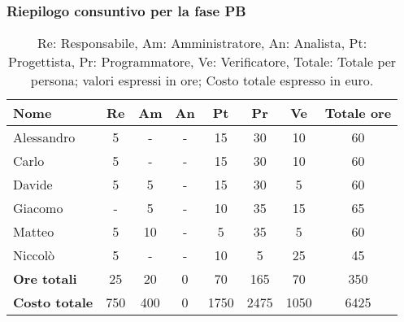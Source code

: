\subsubsection{Riepilogo consuntivo per la fase PB}
\begin{table}[H]
	\centering
	\begin{tabular}{l|c|c|c|c|c|c|c}
		\textbf{Nome}         & \textbf{Re} & \textbf{Am} & \textbf{An} & \textbf{Pt} & \textbf{Pr} & \textbf{Ve} & \textbf{Totale ore} \\
		\hline
		Alessandro            & 5           & -           & -           & 15          & 30          & 10          & 60                  \\
		Carlo                 & 5           & -           & -           & 15          & 30          & 10          & 60                  \\
		Davide                & 5           & 5           & -           & 15          & 30          & 5           & 60                  \\
		Giacomo               & -           & 5           & -           & 10          & 35          & 15          & 65                  \\
		Matteo                & 5           & 10          & -           & 5           & 35          & 5           & 60                  \\
		Niccolò               & 5           & -           & -           & 10          & 5           & 25          & 45                  \\
		\hline
		\textbf{Ore totali}   & 25          & 20          & 0           & 70          & 165         & 70          & 350                 \\
		\textbf{Costo totale} & 750         & 400         & 0           & 1750        & 2475        & 1050        & 6425
	\end{tabular}
	\caption{Re: Responsabile, Am: Amministratore, An: Analista, Pt: Progettista, Pr: Programmatore, Ve: Verificatore, Totale: Totale per persona; valori espressi in ore; Costo totale espresso in euro.}
\end{table}


